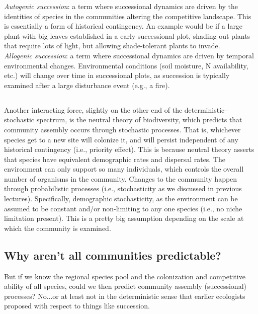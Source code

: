 \documentclass[12pt]{article}
\begin{document}
\textit{Autogenic succession}: a term where successional dynamics are driven by the identities of species in the communities altering the competitive landscape. This is essentially a form of historical contingency. An example would be if a large plant with big leaves established in a early successional plot, shading out plants that require lots of light, but allowing shade-tolerant plants to invade.  \\

\textit{Allogenic succession}: a term where successional dynamics are driven by temporal environmental changes. Environmental conditions (soil moisture, N availability, etc.) will change over time in successional plots, as succession is typically examined after a large disturbance event (e.g., a fire). 






\subsection*{}
Another interacting force, slightly on the other end of the deterministic--stochastic spectrum, is the neutral theory of biodiversity, which predicts that community assembly occurs through stochastic processes. That is, whichever species get to a new site will colonize it, and will persist independent of any historical contingency (i.e., priority effect). This is because neutral theory asserts that species have equivalent demographic rates and dispersal rates. The environment can only support so many individuals, which controls the overall number of organisms in the community. Changes to the community happen through probabilistic processes (i.e., stochasticity as we discussed in previous lectures). Specifically, demographic stochasticity, as the environment can be assumed to be constant and/or non-limiting to any one species (i.e., no niche limitation present). This is a pretty big assumption depending on the scale at which the community is examined. 












\subsection*{Why aren't all communities predictable?}

But if we know the regional species pool and the colonization and competitive ability of all species, could we then predict community assembly (successional) processes? No...or at least not in the deterministic sense that earlier ecologists proposed with respect to things like succession. 
\end{document}
